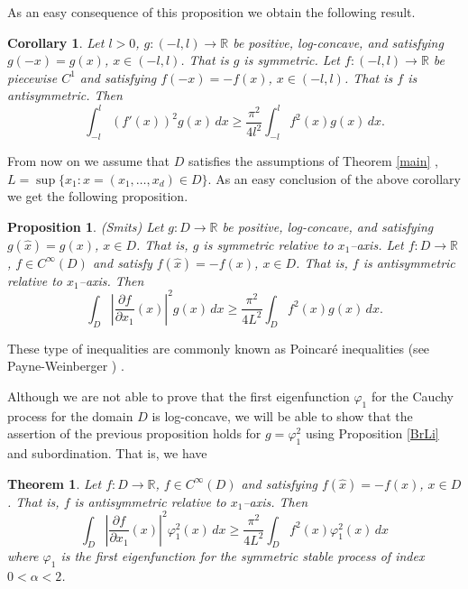 \documentclass[11pt,leqno]{article}
\newtheorem{thm}{Theorem}[section]
\newtheorem{prop}{Proposition}[section]
\newtheorem{cor}{Corollary}[section]
\theoremstyle{definition}
\newcommand{\R}{\mathbb{R}}
\numberwithin{equation}{section}
\begin{document}
As an easy consequence of this proposition we obtain the following result.

\begin{cor}
\label{PWS1a}
Let $l >0$, $g: (-l,l) \to \R$ be positive, log-concave, and satisfying  $g(-x) = g(x)$, 
$x \in (-l,l)$.  That is $g$ is symmetric. Let $f: (-l,l) \to \R$ be piecewise $C^1$ and satisfying
$f(-x) = - f(x)$, $x \in (-l,l)$.  That is $f$ is antisymmetric. Then
$$
\int_{-l}^{l} (f'(x))^{2} g(x) \, dx \ge
\frac{\pi^{2}}{4 l^{2}} \int_{-l}^{l} f^{2}(x) g(x) \, dx. 
$$
\end{cor}


From now on we assume that $D$ satisfies the assumptions of 
 Theorem \ref{main} , $L = \sup\{x_1: x=(x_1,\ldots,x_d) \in D\}$.
As an easy conclusion of the above corollary  we get the following 
proposition.

\begin{prop}\label{smits} (Smits\cite{Sm}) 
\label{PWS2}
Let  $g: D \to \R$ be positive, log-concave, and satisfying  $g(\widehat{x}) = g(x)$,
 $x \in D$.  That is, $g$ is symmetric relative to $x_1$--axis. Let $f: D \to \R$, $f \in
C^{\infty}(D)$ and satisfy $f(\widehat{x}) = - f(x)$, $x \in D$. That is, $f$ is antisymmetric
relative to $x_1$--axis. Then 
\begin{equation}
\label{PWS2f} \int_{D} \left| \frac{\partial f}{\partial x_1} (x) \right|^{2} g(x) \, dx \ge 
\frac{\pi^{2}}{4 L^{2}} 
 \int_{D} f^{2}(x) g(x) \, dx. 
\end{equation}
\end{prop}

These type of inequalities are commonly known as
 Poincar\'e inequalities (see Payne-Weinberger \cite{PW}) .

Although we are not able to prove that the first eigenfunction $\varphi_{1}$ 
for the Cauchy process for the domain $D$ is log-concave,  we will be  able  to 
show that the assertion of the previous proposition holds for $g = \varphi_{1}^{2}$ using 
Proposition \ref{BrLi} and subordination. That is, we have 
 
\begin{thm}
\label{PWS3}
Let $f: D \to \R$, $f \in C^{\infty}(D)$ and satisfying  $f(\widehat{x}) = - f(x)$,  
$x \in D$.  That is, $f$ is antisymmetric relative to $x_1$--axis. Then 
\begin{equation}
\label{PWS3f}
\int_{D} \left| \frac{\partial f}{\partial x_1} (x) \right|^{2} \varphi_1^2(x) \, dx \ge 
\frac{\pi^{2}}{4 L^{2}} 
 \int_{D} f^{2}(x) \varphi_1^2(x) \, dx
\end{equation}
where $\varphi_1$ is the first eigenfunction for the symmetric stable process of index
$0<\alpha<2$. 
\end{thm}
\end{document}
